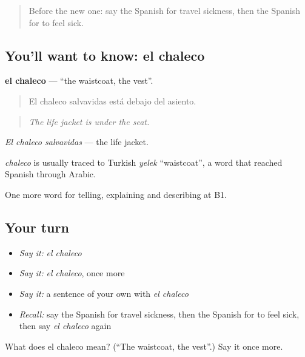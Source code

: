 \label{lesson:ES-C655-chaleco}



\begin{quote}
Before the new one: say the Spanish for travel sickness, then the Spanish for to feel sick.
\end{quote}

\subsection*{You'll want to know: el chaleco}
\textbf{el chaleco} — \textquotedblleft{}the waistcoat, the vest\textquotedblright{}.

\begin{quote}
El chaleco salvavidas está debajo del asiento.
\end{quote}

\begin{quote}
\emph{The life jacket is under the seat.}
\end{quote}

\emph{El chaleco salvavidas} — the life jacket.

\begin{cousinweb}
\emph{chaleco} is usually traced to Turkish \emph{yelek} \textquotedblleft{}waistcoat\textquotedblright{}, a word that reached Spanish through Arabic.
\end{cousinweb}

\begin{grammarlens}[title={What you've built}]
One more word for telling, explaining and describing at B1.
\end{grammarlens}

\subsection*{Your turn}
\begin{itemize}
\raggedright
  \item \emph{Say it:} \emph{el chaleco}
  \item \emph{Say it:} \emph{el chaleco}, once more
  \item \emph{Say it:} a sentence of your own with \emph{el chaleco}
  \item \emph{Recall:} say the Spanish for travel sickness, then the Spanish for to feel sick, then say \emph{el chaleco} again
\end{itemize}

\begin{tcolorbox}[breakable,colback=teal!4,colframe=teal!35!black,title={Before you move on}]
What does el chaleco mean? (\textquotedblleft{}The waistcoat, the vest\textquotedblright{}.) Say it once more.
\end{tcolorbox}
